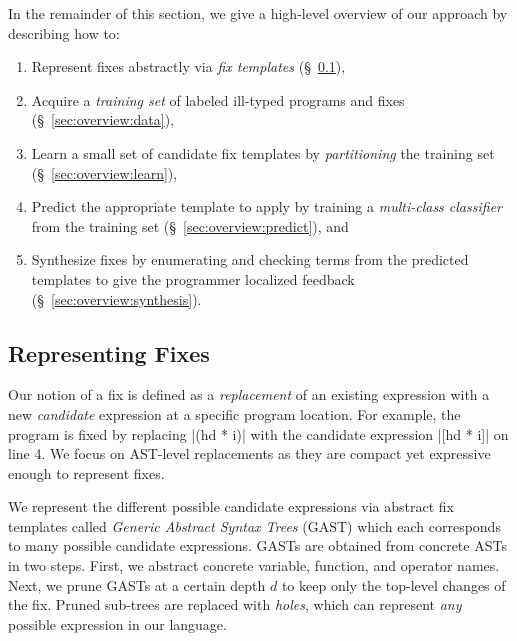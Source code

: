 In the remainder of this section, we give a high-level overview
of our approach by describing how to:

\begin{enumerate}

  \item Represent fixes abstractly via \emph{fix templates}
        (\S~\ref{sec:overview:templates}),

  \item Acquire a \emph{training set} of labeled ill-typed programs and fixes
        (\S~\ref{sec:overview:data}),

  \item Learn a small set of candidate fix templates by \emph{partitioning}
        the training set (\S~\ref{sec:overview:learn}),

  \item Predict the appropriate template to apply by training a
        \emph{multi-class classifier} from the training set
        (\S~\ref{sec:overview:predict}), and

  \item Synthesize fixes by enumerating and checking terms from the
        predicted templates to give the programmer localized feedback
        (\S~\ref{sec:overview:synthesis}).
\end{enumerate}

\subsection{Representing Fixes}
\label{sec:overview:templates}

Our notion of a fix is defined as a \emph{replacement} of an existing expression
with a new \emph{candidate} expression at a specific program location. For
example, the \mbd program is fixed by replacing |(hd * i)| with the candidate
expression |[hd * i]| on line 4. We focus on AST-level replacements as they are
compact yet expressive enough to represent fixes.


%
We represent the different possible candidate expressions via abstract fix
templates called \emph{Generic Abstract Syntax Trees} (GAST) which each
corresponds to many possible candidate expressions.
%
GASTs are obtained from concrete ASTs in two steps.
%
First, we abstract concrete variable, function, and operator names.
%
Next, we prune GASTs at a certain depth $d$ to keep only the top-level changes
of the fix. Pruned sub-trees are replaced with \emph{holes}, which can represent
\emph{any} possible expression in our language.


